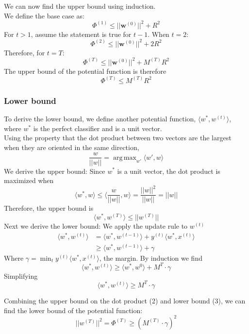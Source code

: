 \documentclass[11pt]{article}
\DeclareMathOperator*{\argmax}{arg\,max}
\begin{document}
We can now find the upper bound using induction.\\
We define the base case as:
$$\Phi^{(1)} \leq ||\mathbf{w}^{(0)}||^2 + R^2$$
For $t>1$, assume the statement is true for $t-1$. When $t=2$:
$$\Phi^{(2)} \leq ||\mathbf{w}^{(0)}||^2 + 2R^2$$
Therefore, for $t=T$:
$$\Phi^{(T)} \leq ||\mathbf{w}^{(0)}||^2 + M^{(T)}R^2$$
The upper bound of the potential function is therefore
\begin{equation}
    \boxed{\Phi^{(T)} \leq M^{(T)}R^2}
\end{equation}

\subsubsection{Lower bound}
To derive the lower bound, we define another potential function, $\langle w^*, w^{(t)}\rangle$, where $w^*$ is the perfect classifier and is a unit vector.\\
Using the property that the dot product between two vectors are the largest when they are oriented in the same direction, 
$$\frac{w}{||w||} = \argmax_{w'}\langle w', w\rangle$$
We derive the upper bound:
Since $w^*$ is a unit vector, the dot product is maximized when
$$\langle w^*, w\rangle \leq \langle \frac{w}{||w||}, w\rangle = \frac{||w||^2}{||w||} = ||w||$$
Therefore, the upper bound is
\begin{equation}
    \boxed{\langle w^*, w^{(T)}\rangle \leq ||w^{(T)}||}
\end{equation}
Next we derive the lower bound:
We apply the update rule to $w^{(t)}$
\begin{align*}
    \langle w^*, w^{(t)}\rangle &= \langle w^*, w^{(t-1)}\rangle + y^{(t)}\langle w^*, x^{(t)}\rangle\\
    &\geq \langle w^*, w^{(t-1)}\rangle + \gamma
\end{align*}
Where $\gamma = \min_t y^{(t)}\langle w^*, x^{(t)}\rangle$, the margin. 
By induction we find
$$\langle w^*, w^{(t)}\rangle \geq \langle w^*, w^{0}\rangle + M^T\cdot \gamma$$
Simplifying
\begin{equation}
    \boxed{\langle w^*, w^{(t)}\rangle \geq M^T\cdot \gamma}
\end{equation}


Combining the upper bound on the dot product (2) and lower bound (3), we can find the lower bound of the potential function:
\begin{equation}
    \boxed{||w^{(T)}||^2 = \Phi^{(T)} \geq (M^{(T)}\cdot \gamma)^2}
\end{equation}
\end{document}
